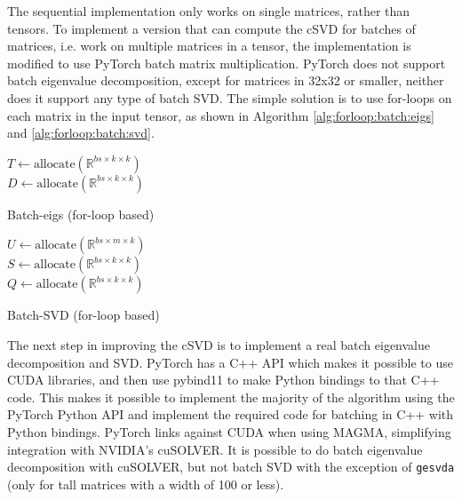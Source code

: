 The sequential implementation only works on single matrices, rather than tensors. To implement a version that can compute the cSVD for batches of matrices, i.e. work on multiple matrices in a tensor, the implementation is modified to use PyTorch batch matrix multiplication. PyTorch does not support batch eigenvalue decomposition, except for matrices in 32x32 or smaller, neither does it support any type of batch SVD. The simple solution is to use for-loops on each matrix in the input tensor, as shown in Algorithm \ref{alg:forloop:batch:eigs} and \ref{alg:forloop:batch:svd}.

\begin{algorithm}[H]
\label{alg:forloop:batch:eigs}
\SetAlgoLined
{}
$T \gets \mathrm{allocate}(\mathbb{R}^{bs \times k \times k})$ \\
$D \gets \mathrm{allocate}(\mathbb{R}^{bs \times k \times k})$ \\
\caption{Batch-eigs (for-loop based)}
\end{algorithm}

\begin{algorithm}[H]
  \label{alg:forloop:batch:svd}
\SetAlgoLined
{}
$U \gets \mathrm{allocate}(\mathbb{R}^{bs \times m \times k})$ \\
$S \gets \mathrm{allocate}(\mathbb{R}^{bs \times k \times k})$ \\
$Q \gets \mathrm{allocate}(\mathbb{R}^{bs \times k \times k})$ \\
\caption{Batch-SVD (for-loop based)}
\end{algorithm}

The next step in improving the cSVD is to implement a real batch eigenvalue decomposition and SVD. PyTorch has a C++ API which makes it possible to use CUDA libraries, and then use pybind11 to make Python bindings to that C++ code. This makes it possible to implement the majority of the algorithm using the PyTorch Python API and implement the required code for batching in C++ with Python bindings. PyTorch links against CUDA when using MAGMA, simplifying integration with NVIDIA's cuSOLVER. It is possible to do batch eigenvalue decomposition with cuSOLVER, but not batch SVD with the exception of \texttt{gesvda} (only for tall matrices with a width of 100 or less).

